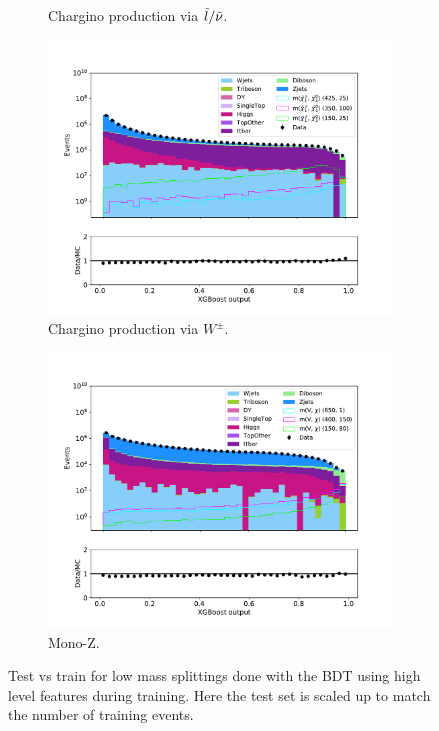 \begin{figure}[H]
\begin{subfigure}[t!]{0.49\textwidth}
        \caption{Chargino production via $\Tilde{l}/\Tilde{\nu}$.}
        \label{fig:}
    \end{subfigure}      
    \begin{subfigure}[t!]{0.49\textwidth}
        \includegraphics[width = \textwidth]{Figures/Stacked/stackedplot_BDT_High_level_WW.pdf}
        \caption{Chargino production via $W^\pm$.}
        \label{fig:}
    \end{subfigure}
    \begin{subfigure}[t!]{0.49\textwidth}
        \includegraphics[width = \textwidth]{Figures/Stacked/stackedplot_BDT_High_level_monoZ.pdf}
        \caption{Mono-Z.}
        \label{fig:}
    \end{subfigure}
    \caption{Test vs train for low mass splittings done with the BDT using high level features during training. Here the test set is scaled up to match the number of training events.}
    \label{fig:}
\end{figure}